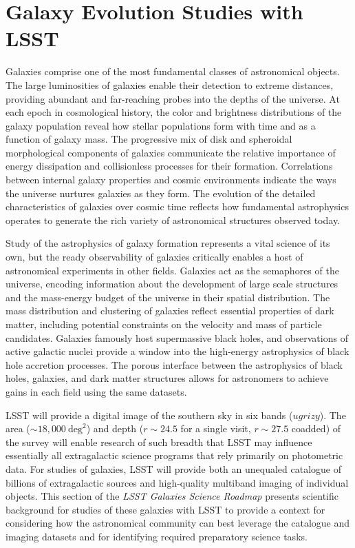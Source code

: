 
\chapter[Galaxy Evolution Studies with LSST]{Galaxy Evolution Studies with LSST}
\label{ch:science_background}
{\justify


Galaxies comprise one of the most fundamental classes of astronomical objects. 
The large luminosities of galaxies enable their 
detection to extreme distances, providing abundant
and far-reaching probes into the depths of the universe.
At each epoch in cosmological history, the color
and brightness distributions of the galaxy population
reveal how stellar populations form with time and
as a function of galaxy mass. The progressive mix of
disk and spheroidal morphological components of 
galaxies communicate the relative importance of
energy dissipation and collisionless processes
for their formation.
Correlations between internal galaxy properties and
cosmic environments indicate
the ways the universe nurtures galaxies as they form.
The evolution of the
detailed characteristics of galaxies over cosmic time
reflects how fundamental astrophysics
operates to generate the rich variety of 
astronomical structures observed today.

Study of the astrophysics of galaxy formation represents
a vital science of its own, but the ready
observability of galaxies critically enables a host of
astronomical experiments in other fields. 
Galaxies act as the semaphores of the
universe, encoding information about
the development of large scale
structures and the mass-energy budget of the
universe in their spatial distribution. The mass distribution
and clustering of galaxies reflect essential
properties of dark matter, including potential
constraints on the velocity and mass of particle candidates.
Galaxies famously host supermassive black holes, 
and observations of active galactic nuclei provide
a window into the high-energy astrophysics of black hole
accretion processes. The porous interface between the
astrophysics of black holes, galaxies, and 
dark matter structures allows for astronomers to 
achieve gains in each field using the same datasets.

LSST will provide a 
digital image of the southern sky in six bands ($ugrizy$).
The area ($\sim18,000~\mathrm{deg}^2$) and depth 
($r\sim24.5$ for a single visit, $r\sim27.5$ coadded) of
the survey will enable research of such breadth
that LSST may influence essentially all extragalactic 
science programs that rely primarily on photometric data.
For studies of galaxies, LSST will provide both an unequaled 
catalogue of billions of extragalactic sources and high-quality 
multiband imaging of individual objects. This section of
the {\it LSST Galaxies Science Roadmap} presents scientific
background for studies of these galaxies with LSST to provide a
context for considering how the astronomical community can
best leverage the catalogue and imaging datasets and for
identifying required preparatory science tasks.

}
